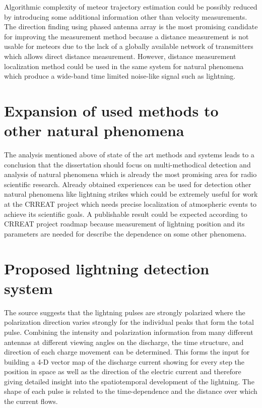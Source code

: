 \documentclass[twoside]{ctuthesis}
\theoremstyle{plain}
\theoremstyle{definition}
\theoremstyle{note}
\begin{document}
Algorithmic complexity of meteor trajectory estimation could be possibly reduced by introducing some additional information other than velocity measurements.  The direction finding using phased antenna array is the most promising candidate for improving the measurement method because a distance measurement is not usable for meteors due to the lack of a globally available network of transmitters which allows direct distance measurement.  However, distance measurement localization method could be used in the same system for natural phenomena which produce a wide-band time limited noise-like signal such as lightning.

\section{Expansion of used methods to other natural phenomena}

The analysis mentioned above of state of the art methods and systems leads to a conclusion that the dissertation should focus on multi-methodical detection and analysis of natural phenomena which is already the most promising area for radio scientific research. 
Already obtained experiences can be used for detection other natural phenomena like lightning strikes which could be extremely useful for work at the CRREAT project which needs precise localization of atmospheric events to achieve its scientific goals. A publishable result could be expected according to CRREAT project roadmap because measurement of lightning position and its parameters are needed for describe the dependence on some other phenomena.  


\section{Proposed lightning detection system}
The source \cite{LOFAR_lightning} suggests that the lightning pulses are strongly
polarized where the polarization direction varies strongly for the individual peaks that form the
total pulse. Combining the intensity and polarization information from many different antennas
at different viewing angles on the discharge, the time structure, and direction of each charge movement can be determined.  This forms the input for building a 4-D vector map of the discharge current showing for every step the position in space as well as the direction of the
electric current and therefore giving detailed insight into the spatiotemporal development of the
lightning.  The shape of each pulse is related to the time-dependence and the distance over which the current flows.
\end{document}
